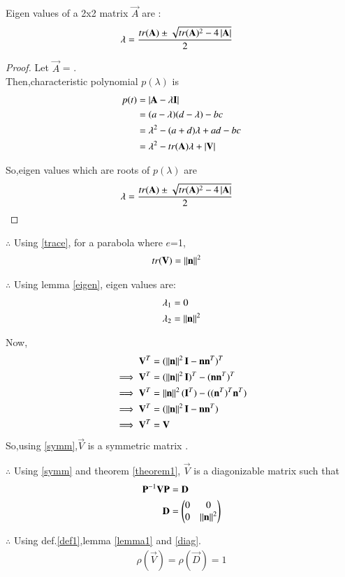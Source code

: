 \documentclass[journal,12pt,twocolumn]{IEEEtran}
\begin{document}
\begin{lemma}
\label{eigen}
Eigen values of a 2x2 matrix $\vec{A}$ are :
\begin{align}
    \lambda &= \frac{tr(\mathbf{A}) \pm \sqrt{tr(\mathbf{A})^{2}-4\left\vert\mathbf{A}\right\vert}}{2}
\end{align}
\end{lemma}
\begin{proof}
Let $\vec{A}$ = .
\\
Then,characteristic polynomial $p(\lambda)$ is
\begin{align}
    p(t) &= \left\vert\mathbf{A-\lambda\mathbf{I}}\right\vert
    \\
    &= (a-\lambda)(d-\lambda)-bc
    \\
    &= \lambda^2 -(a+d)\lambda + ad-bc
    \\
    &= \lambda^2 -tr(\mathbf{A})\lambda + \left\vert\mathbf{V}\right\vert
\end{align}

So,eigen values which are roots of $p(\lambda)$ are
\begin{align}
    \lambda &= \frac{tr(\mathbf{A}) \pm \sqrt{tr(\mathbf{A})^{2}-4\left\vert\mathbf{A}\right\vert}}{2}
\end{align}

\end{proof}

$\therefore$ Using \eqref{trace}, for a parabola where $e$=1,
\begin{align}
    tr(\mathbf{V}) &=\left\lVert\mathbf{n}\right\rVert^2
\end{align}

$\therefore$ Using lemma \ref{eigen}, eigen values are:
\begin{align}
    \lambda_1 &= 0
    \\
    \lambda_2 &= \left\lVert\mathbf{n}\right\rVert^2
\end{align}

Now,
\begin{align}
    \mathbf{V}^T &= (\left\lVert\mathbf{n}\right\rVert^2\mathbf{I}-\mathbf{n}\mathbf{n}^T)^T
    \\
    \implies \mathbf{V}^T &= (\left\lVert\mathbf{n}\right\rVert^2\mathbf{I})^T-(\mathbf{n}\mathbf{n}^T)^T
    \\
    \implies \mathbf{V}^T &= \left\lVert\mathbf{n}\right\rVert^2(\mathbf{I}^T) - ((\mathbf{n}^T)^T\mathbf{n}^T)
    \\
    \implies \mathbf{V}^T &= (\left\lVert\mathbf{n}\right\rVert^2\mathbf{I}-\mathbf{n}\mathbf{n}^T)
    \\
    \implies \mathbf{V}^T &= \mathbf{V}    \label{symm}
\end{align}
So,using \eqref{symm},$\vec{V}$ is a symmetric matrix .


$\therefore$ Using \eqref{symm} and theorem \ref{theorem1}, $\vec{V}$ is a diagonizable matrix such that
\begin{align}
    \mathbf{P}^{-1}\mathbf{V}\mathbf{P} &= \mathbf{D} 
    \\
    \mathbf{D} &= \begin{pmatrix}0 & 0 \\ 0 & \left\lVert\mathbf{n}\right\rVert^2\end{pmatrix} \label{diag}
\end{align}

$\therefore$
Using def.\ref{def1},lemma \ref{lemma1} and \eqref{diag}.
\begin{align}
    \rho(\vec{V}) = \rho(\vec{D}) = 1
\end{align}
\end{document}
